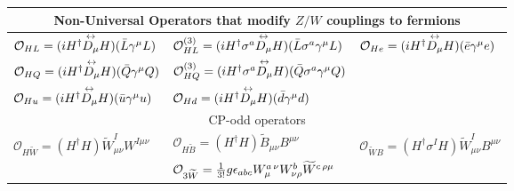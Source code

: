 \begin{table}[h]
\begin{center}
{\begin{tabular}{lll}
  \hline\hline
  \multicolumn{3}{c}{Non-Universal Operators that modify $Z/W$ couplings to fermions}\\
  \hline
            ${\cal O}_{HL}=(i H^\dagger {\overset{\text{\scriptsize$\leftrightarrow$}}{ D_\mu}} H)( \bar L\gamma^\mu L)$     
&         ${\cal O}_{HL}^{(3)}=(i H^\dagger \sigma^a {\overset{\text{\scriptsize$\leftrightarrow$}}{ D_\mu}} H)( \bar L\sigma^a\gamma^\mu L)$  
&            ${\cal O}_{He} =(i H^\dagger {\overset{\text{\scriptsize$\leftrightarrow$}}{ D_\mu}} H)( \bar e \gamma^\mu e )$             \\
            ${\cal O}_{HQ}=(i H^\dagger  {\overset{\text{\scriptsize$\leftrightarrow$}}{ D_\mu}} H)( \bar Q \gamma^\mu Q )$       &
               ${\cal O}_{HQ}^{(3)}=(i H^\dagger \sigma^a {\overset{\text{\scriptsize$\leftrightarrow$}}{ D_\mu}} H)( \bar Q \sigma^a\gamma^\mu Q )$     &   \\
          ${\cal O}_{Hu} =(i H^\dagger {\overset{\text{\scriptsize$\leftrightarrow$}}{ D_\mu}} H)( \bar u \gamma^\mu u )$        
 &            ${\cal O}_{Hd} =(i H^\dagger {\overset{\text{\scriptsize$\leftrightarrow$}}{ D_\mu}} H)( \bar d \gamma^\mu d )$     &      \\ 
  \hline\hline
  \multicolumn{3}{c}{CP-odd operators}\\
  \hline
 $\mathcal{O}_{H \widetilde W} = (H^\dagger H) \widetilde W^{I}_{\mu\nu}W^{I\mu\nu}$    &
 $\mathcal{O}_{H \widetilde B} = (H^\dagger H) \widetilde B_{\mu\nu}B^{\mu\nu}$     &$\mathcal{O}_{ \widetilde W\! B} = ( H^\dagger\sigma ^I H)
\widetilde W_{\mu\nu}^IB^{\mu\nu}$\\
&   ${\cal O}_{3\widetilde W}= \frac{1}{3!} g\epsilon_{abc}W^{a\, \nu}_{\mu}W^{b}_{\nu\rho}\widetilde W^{c\, \rho\mu}$&  \\
\hline\hline
 \end{tabular}
 }
\end{center}
\end{table}
\renewcommand{\arraystretch}{1}


